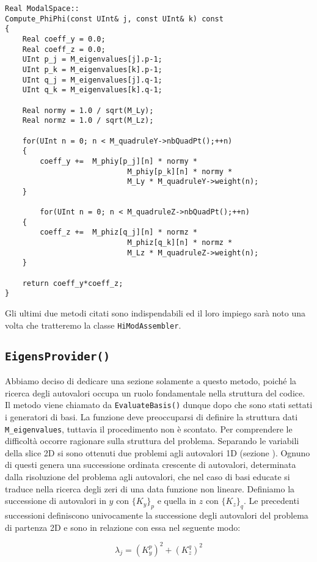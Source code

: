 \begin{lstlisting}[style = general]
Real ModalSpace::
Compute_PhiPhi(const UInt& j, const UInt& k) const
{
	Real coeff_y = 0.0;
	Real coeff_z = 0.0;
	UInt p_j = M_eigenvalues[j].p-1;
	UInt p_k = M_eigenvalues[k].p-1;
	UInt q_j = M_eigenvalues[j].q-1;
	UInt q_k = M_eigenvalues[k].q-1;
	
	Real normy = 1.0 / sqrt(M_Ly);
	Real normz = 1.0 / sqrt(M_Lz);
	
	for(UInt n = 0; n < M_quadruleY->nbQuadPt();++n)
	{
		coeff_y +=	M_phiy[p_j][n] * normy *	
							M_phiy[p_k][n] * normy *
							M_Ly * M_quadruleY->weight(n);
	}
	
		for(UInt n = 0; n < M_quadruleZ->nbQuadPt();++n)
	{
		coeff_z +=	M_phiz[q_j][n] * normz *	
							M_phiz[q_k][n] * normz *
							M_Lz * M_quadruleZ->weight(n);
	}
	
	return coeff_y*coeff_z;
}
\end{lstlisting}
 
 Gli ultimi due metodi citati sono indispendabili ed il loro impiego sar\`a noto una volta che tratteremo la classe \texttt{HiModAssembler}.
 
 \subsection{\texttt{EigensProvider()}}
 Abbiamo deciso di dedicare una sezione solamente a questo metodo, poich\'e la ricerca degli autovalori occupa un ruolo fondamentale nella struttura del codice.
 Il metodo viene chiamato da \texttt{EvaluateBasis()} dunque dopo che sono stati settati i generatori di basi. La funzione deve preoccuparsi di definire la struttura dati \texttt{M\_eigenvalues}, tuttavia il procedimento non \`e scontato. 
 Per comprendere le difficolt\`a occorre ragionare sulla struttura del problema. Separando le variabili della slice 2D si sono ottenuti due problemi agli autovalori 1D (sezione ). Ognuno di questi genera una successione ordinata crescente di autovalori, determinata dalla risoluzione del problema agli autovalori, che nel caso di basi educate si traduce nella ricerca degli zeri di una data funzione non lineare. Definiamo la successione di autovalori in $y$ con $\{K_y\}_p$ e quella in $z$ con $\{K_z\}_q$. Le precedenti successioni definiscono univocamente la successione degli autovalori del problema di partenza 2D e sono in relazione con essa nel seguente modo:

\begin{equation}
\label{eq: autovalori}
 \lambda_j = (K_y^p)^2 + (K_z^q)^2
\end{equation} 

